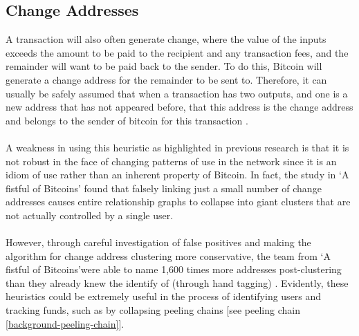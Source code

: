 \subsection{Change Addresses}
A transaction will also often generate change, where the value of the inputs exceeds the amount to be paid to the recipient and any transaction fees, and the remainder will want to be paid back to the sender. To do this, Bitcoin will generate a change address for the remainder to be sent to. Therefore, it can usually be safely assumed that when a transaction has two outputs, and one is a new address that has not appeared before, that this address is the change address and belongs to the sender of bitcoin for this transaction \cite{RefWorks:doc:5c3de14be4b042abd3bcc2c6}. 
\\\\
A weakness in using this heuristic as highlighted in previous research \cite{Refworks:doc:5c3de7e3e4b0ea6196452d80} is that it is not robust in the face of changing patterns of use in the network since it is an idiom of use rather than an inherent property of Bitcoin. In fact, the study in \lq A fistful of Bitcoins\rq  \cite{Refworks:doc:5c3de7e3e4b0ea6196452d80} found that falsely linking just a small number of change addresses causes entire relationship graphs to collapse into giant clusters that are not actually controlled by a single user. 
\\\\
However, through careful investigation of false positives and making the algorithm for change address clustering more conservative, the team from \lq A fistful of Bitcoins\rq were able to name 1,600 times more addresses post-clustering than they already knew the identify of (through hand tagging) \cite{Refworks:doc:5c3de7e3e4b0ea6196452d80}. Evidently, these heuristics could be extremely useful in the process of identifying users and tracking funds, such as by collapsing peeling chains [see peeling chain \ref{background-peeling-chain}].

